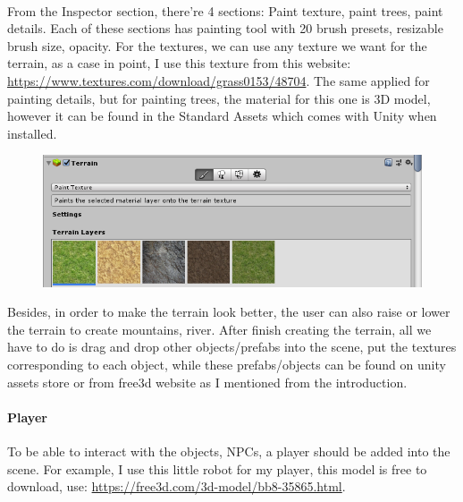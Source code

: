 \documentclass[a4paper, 13pt]{extarticle}
\begin{document}
 	  \\[0.15cm]
 	  From the Inspector section, there're 4 sections: Paint texture, paint trees, paint details. Each of these sections has painting tool with 20 brush presets, resizable brush size, opacity. For the textures, we can use any texture we want for the terrain, as a case in point, I use this texture from this website: \href{https://www.textures.com/download/grass0153/48704}{https://www.textures.com/download/grass0153/48704}. The same applied for painting details, but for painting trees, the material for this one is 3D model, however it can be found in the Standard Assets which comes with Unity when installed. 
 	   \begin{figure}[h]
 	   	 \centering
 	   	 \begin{minipage}{1\textwidth}
 	   	 	\centering
 	   	 	\includegraphics[width=0.75\linewidth]{intructions/3.png}
 	   	 	\label{fig:test4}
 	   	 \end{minipage}
 		 \end{figure}  
 		 
 	Besides, in order to make the terrain look better, the user can also raise or lower the terrain to create mountains, river. After finish creating the terrain, all we have to do is drag and drop other objects/prefabs into the scene, put the textures corresponding to each object, while these prefabs/objects can be found on unity assets store or from free3d website as I mentioned from the introduction. 
 	 \paragraph{Player}
 	 To be able to interact with the objects, NPCs, a player should be added into the scene. For example, I use this little robot for my player, this model is free to download, use: \href{https://free3d.com/3d-model/bb8-35865.html}{https://free3d.com/3d-model/bb8-35865.html}.
 	 
\end{document}
